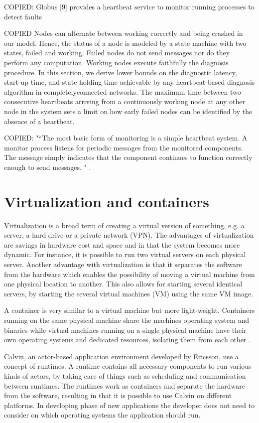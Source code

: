 \documentclass{cslthse-msc}
\begin{document}
COPIED:
Globus [9] provides a heartbeat service to monitor running processes to detect faults \cite{effTaskReplMobGrid}

COPIED
Nodes can alternate between working correctly and being crashed in our model. Hence, the status of a node is modeled by a state machine with two states, failed and working. Failed nodes do not send messages nor do they perform any computation. Working nodes execute faithfully the diagnosis procedure. In this section, we derive lower bounds on the diagnostic latency, start-up time, and state holding time achievable by any heartbeat-based diagnosis algorithm in completelyconnected networks. The maximum time between two consecutive heartbeats arriving from a continuously working node at any other node in the system sets a limit on how early failed nodes can be identified by the absence of a heartbeat. \cite{distDiagnosis}

COPIED: "“The most basic form of monitoring is a simple heartbeat system. A monitor process listens for periodic messages from the monitored components. The message simply indicates that the component continues to function correctly enough to send messages. " \cite{surveyFaultParallel}.
\fi

\section{Virtualization and containers} \label{sec:background_virtualization}
Virtualization is a broad term of creating a virtual version of something, e.g. a server, a hard drive or a private network (VPN). The advantages of virtualization are savings in hardware cost and space and in that the system becomes more dynamic. For instance, it is possible to run two virtual servers on each physical server. Another advantage with virtualization is that it separates the software from the hardware which enables the possibility of moving a virtual machine from one physical location to another. This also allows for starting several identical servers, by starting the several virtual machines (VM) using the same VM image.

A container is very similar to a virtual machine but more light-weight. Containers running on the same physical machine share the machines operating system and binaries while virtual machines running on a single physical machine have their own operating systems and dedicated resources, isolating them from each other \cite{vm_vs_container}.

Calvin, an actor-based application environment developed by Ericsson, use a concept of runtimes. A runtime contains all necessary components to run various kinds of actors, by taking care of things such as scheduling and communication between runtimes. The runtimes work as containers and separate the hardware from the software, resulting in that it is possible to use Calvin on different platforms. In developing phase of new applications the developer does not need to consider on which operating systems the application should run.
\end{document}
